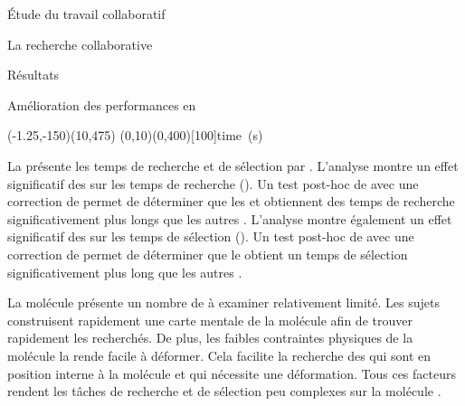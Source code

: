 \documentclass[myfrancais]{mythesis}
\begin{document}
\begin{mypart}{Étude du travail collaboratif}
\begin{mychapter}{La recherche collaborative}
\begin{mysection}{Résultats}
\begin{mysubsection}{Amélioration des performances en }
					\begin{myfigure}
						\begin{myps}(-1.25,-150)(10,475)
							\myaxes(0,10){}(0,400)[100]{time~(s)}
						\end{myps}
					\end{myfigure}

					La  présente les temps de recherche et de sélection par  .
					L'analyse montre un effet significatif des   sur les temps de recherche ().
					Un test post-hoc de  avec une correction de  permet de déterminer que les   et  obtiennent des temps de recherche significativement plus longs que les autres .
					L'analyse montre également un effet significatif des   sur les temps de sélection ().
					Un test post-hoc de  avec une correction de  permet de déterminer que le   obtient un temps de sélection significativement plus long que les autres .

					La molécule \myTRPCAGE présente un nombre de  à examiner relativement limité.
					Les sujets construisent rapidement une carte mentale de la molécule afin de trouver rapidement les  recherchés.
					De plus, les faibles contraintes physiques de la molécule la rende facile à déformer.
					Cela facilite la recherche des  qui sont en position interne à la molécule et qui nécessite une déformation.
					Tous ces facteurs rendent les tâches de recherche et de sélection peu complexes sur la molécule \myTRPCAGE.


\end{mysubsection}
\end{mysection}
\end{mychapter}
\end{mypart}
\end{document}
